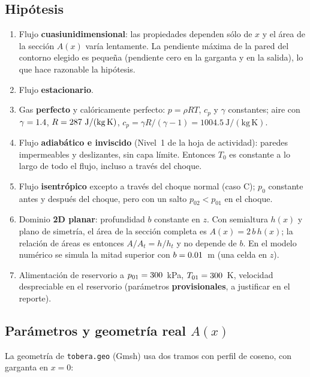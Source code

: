 \subsection{Hipótesis}
\begin{enumerate}[label=\textbf{H\arabic*.},leftmargin=2.2em]
\item Flujo \textbf{cuasiunidimensional}: las propiedades dependen sólo de $x$ y el área de la sección
  $A(x)$ varía lentamente. La pendiente máxima de la pared del contorno elegido es pequeña
  (pendiente cero en la garganta y en la salida), lo que hace razonable la hipótesis.
\item Flujo \textbf{estacionario}.
\item Gas \textbf{perfecto} y calóricamente perfecto: $p=\rho R T$, $c_p$ y $\gamma$ constantes;
  aire con $\gamma=1.4$, $R=287\ \mathrm{J/(kg\,K)}$, $c_p=\gamma R/(\gamma-1)=1004.5\ \mathrm{J/(kg\,K)}$.
\item Flujo \textbf{adiabático e inviscido} (Nivel~1 de la hoja de actividad): paredes impermeables y
  deslizantes, sin capa límite. Entonces $T_0$ es constante a lo largo de todo el flujo, incluso a través del choque.
\item Flujo \textbf{isentrópico} excepto a través del choque normal (caso C); $p_0$ constante antes y
  después del choque, pero con un salto $p_{02}<p_{01}$ en el choque.
\item Dominio \textbf{2D planar}: profundidad $b$ constante en $z$. Con semialtura $h(x)$ y plano de simetría, el área
  de la sección completa es $A(x)=2\,b\,h(x)$; la relación de áreas es entonces
  $A/A_t=h/h_t$ y no depende de $b$. En el modelo numérico se simula la mitad superior con
  $b=0.01$~m (una celda en $z$).
\item Alimentación de reservorio a $p_{01}=300$~kPa, $T_{01}=300$~K, velocidad despreciable en
  el reservorio (parámetros \textbf{provisionales}, a justificar en el reporte).
\end{enumerate}

\subsection{Parámetros y geometría real $A(x)$}
La geometría de \texttt{tobera.geo} (Gmsh) usa dos tramos con perfil de coseno, con garganta en $x=0$:

